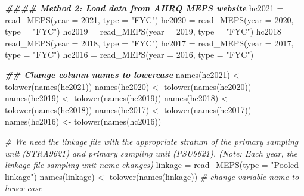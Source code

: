 \documentclass[
]{book}
\newenvironment{Shaded}{\begin{snugshade}}{\end{snugshade}}
\newcommand{\AttributeTok}[1]{\textcolor[rgb]{0.77,0.63,0.00}{#1}}
\newcommand{\CommentTok}[1]{\textcolor[rgb]{0.56,0.35,0.01}{\textit{#1}}}
\newcommand{\DecValTok}[1]{\textcolor[rgb]{0.00,0.00,0.81}{#1}}
\newcommand{\DocumentationTok}[1]{\textcolor[rgb]{0.56,0.35,0.01}{\textbf{\textit{#1}}}}
\newcommand{\FunctionTok}[1]{\textcolor[rgb]{0.00,0.00,0.00}{#1}}
\newcommand{\NormalTok}[1]{#1}
\newcommand{\OtherTok}[1]{\textcolor[rgb]{0.56,0.35,0.01}{#1}}
\newcommand{\StringTok}[1]{\textcolor[rgb]{0.31,0.60,0.02}{#1}}
\begin{document}
\begin{Shaded}
\begin{Highlighting}[]
\DocumentationTok{\#\#\#\# Method 2: Load data from AHRQ MEPS website}
\NormalTok{hc2021 }\OtherTok{=} \FunctionTok{read\_MEPS}\NormalTok{(}\AttributeTok{year =} \DecValTok{2021}\NormalTok{, }\AttributeTok{type =} \StringTok{"FYC"}\NormalTok{)}
\NormalTok{hc2020 }\OtherTok{=} \FunctionTok{read\_MEPS}\NormalTok{(}\AttributeTok{year =} \DecValTok{2020}\NormalTok{, }\AttributeTok{type =} \StringTok{"FYC"}\NormalTok{)}
\NormalTok{hc2019 }\OtherTok{=} \FunctionTok{read\_MEPS}\NormalTok{(}\AttributeTok{year =} \DecValTok{2019}\NormalTok{, }\AttributeTok{type =} \StringTok{"FYC"}\NormalTok{)}
\NormalTok{hc2018 }\OtherTok{=} \FunctionTok{read\_MEPS}\NormalTok{(}\AttributeTok{year =} \DecValTok{2018}\NormalTok{, }\AttributeTok{type =} \StringTok{"FYC"}\NormalTok{)}
\NormalTok{hc2017 }\OtherTok{=} \FunctionTok{read\_MEPS}\NormalTok{(}\AttributeTok{year =} \DecValTok{2017}\NormalTok{, }\AttributeTok{type =} \StringTok{"FYC"}\NormalTok{)}
\NormalTok{hc2016 }\OtherTok{=} \FunctionTok{read\_MEPS}\NormalTok{(}\AttributeTok{year =} \DecValTok{2016}\NormalTok{, }\AttributeTok{type =} \StringTok{"FYC"}\NormalTok{)}


\DocumentationTok{\#\# Change column names to lowercase}
\FunctionTok{names}\NormalTok{(hc2021) }\OtherTok{\textless{}{-}} \FunctionTok{tolower}\NormalTok{(}\FunctionTok{names}\NormalTok{(hc2021))}
\FunctionTok{names}\NormalTok{(hc2020) }\OtherTok{\textless{}{-}} \FunctionTok{tolower}\NormalTok{(}\FunctionTok{names}\NormalTok{(hc2020))}
\FunctionTok{names}\NormalTok{(hc2019) }\OtherTok{\textless{}{-}} \FunctionTok{tolower}\NormalTok{(}\FunctionTok{names}\NormalTok{(hc2019))}
\FunctionTok{names}\NormalTok{(hc2018) }\OtherTok{\textless{}{-}} \FunctionTok{tolower}\NormalTok{(}\FunctionTok{names}\NormalTok{(hc2018))}
\FunctionTok{names}\NormalTok{(hc2017) }\OtherTok{\textless{}{-}} \FunctionTok{tolower}\NormalTok{(}\FunctionTok{names}\NormalTok{(hc2017))}
\FunctionTok{names}\NormalTok{(hc2016) }\OtherTok{\textless{}{-}} \FunctionTok{tolower}\NormalTok{(}\FunctionTok{names}\NormalTok{(hc2016))}


\CommentTok{\# We need the linkage file with the appropriate stratum of the primary sampling unit (STRA9621) and primary sampling unit (PSU9621). (Note: Each year, the linkage file sampling unit name changes)}
\NormalTok{linkage }\OtherTok{=} \FunctionTok{read\_MEPS}\NormalTok{(}\AttributeTok{type =} \StringTok{"Pooled linkage"}\NormalTok{) }
\FunctionTok{names}\NormalTok{(linkage) }\OtherTok{\textless{}{-}} \FunctionTok{tolower}\NormalTok{(}\FunctionTok{names}\NormalTok{(linkage)) }\CommentTok{\# change variable name to lower case}




\end{Highlighting}
\end{Shaded}
\end{document}
